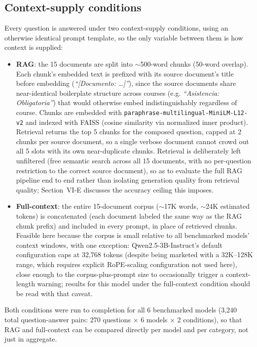 \documentclass[conference]{IEEEtran}
\begin{document}
\subsection{Context-supply conditions}
\label{ssec:context-conditions}

Every question is answered under two context-supply conditions, using an otherwise identical prompt template, so the only variable between them is how context is supplied:

\begin{itemize}
  \item \textbf{RAG}: the 15 documents are split into $\sim$500-word chunks (50-word overlap).
  Each chunk's embedded text is prefixed with its source document's title before embedding (\textit{``[Documento: \ldots]''}), since the source documents share near-identical boilerplate structure across courses (e.g. \textit{``Asistencia: Obligatoria''}) that would otherwise embed indistinguishably regardless of course.
  Chunks are embedded with \texttt{paraphrase-multilingual-MiniLM-L12-v2} and indexed with FAISS (cosine similarity via normalized inner product).
  Retrieval returns the top 5 chunks for the composed question, capped at 2 chunks per source document, so a single verbose document cannot crowd out all 5 slots with its own near-duplicate chunks.
  Retrieval is deliberately left unfiltered (free semantic search across all 15 documents, with no per-question restriction to the correct source document), so as to evaluate the full RAG pipeline end to end rather than isolating generation quality from retrieval quality; Section~VI-E discusses the accuracy ceiling this imposes.
  \item \textbf{Full-context}: the entire 15-document corpus ($\sim$17K words, $\sim$24K estimated tokens) is concatenated (each document labeled the same way as the RAG chunk prefix) and included in every prompt, in place of retrieved chunks.
  Feasible here because the corpus is small relative to all benchmarked models' context windows, with one exception: Qwen2.5-3B-Instruct's default configuration caps at 32{,}768 tokens (despite being marketed with a 32K--128K range, which requires explicit RoPE-scaling configuration not used here), close enough to the corpus-plus-prompt size to occasionally trigger a context-length warning; results for this model under the full-context condition should be read with that caveat.
\end{itemize}

Both conditions were run to completion for all 6 benchmarked models (3{,}240 total question-answer pairs: 270 questions $\times$ 6 models $\times$ 2 conditions), so that RAG and full-context can be compared directly per model and per category, not just in aggregate.
\end{document}
